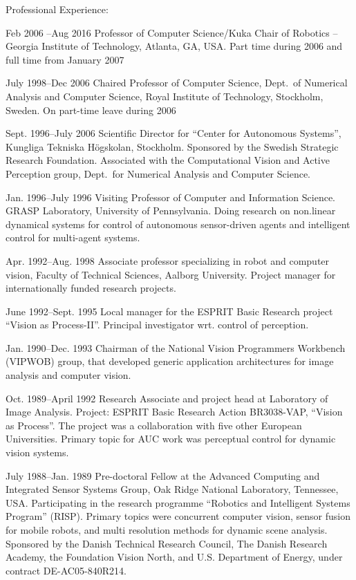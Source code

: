 \documentclass{article}
\begin{document}
\begin{cv}
\begin{cvlist}{Professional Experience:}
\item[Feb 2006 --Aug 2016]  Professor of Computer Science/Kuka
  Chair of Robotics -- Georgia Institute of Technology, Atlanta, GA,
  USA. Part time during 2006 and full time from January 2007

\item[July 1998--Dec 2006] Chaired Professor of Computer Science,
  Dept.\ of Numerical Analysis and Computer Science, Royal Institute
  of Technology, Stockholm, Sweden. On part-time leave during 2006

\item[Sept. 1996--July 2006] Scientific Director for ``Center for
  Autonomous Systems'', Kungliga Tek\-ni\-ska H\"og\-skolan,
  Stock\-holm.  Sponsored by the Swedish Strategic Research
  Foundation. Associated with the Computational Vision and Active
  Perception group, Dept.~for Numerical Analysis and Computer
  Science.

\item[Jan. 1996--July 1996] Visiting Professor of Computer and
  Information Science.  GRASP Laboratory, University of Pennsylvania.
  Doing research on non.linear dynamical systems for control of
  autonomous sensor-driven agents and intelligent control for
  multi-agent systems.

\item[Apr. 1992--Aug. 1998] Associate professor specializing in robot
  and computer vision, Faculty of Technical Sciences, Aalborg
  University.  Project manager for internationally funded research
  projects.

\item[June 1992--Sept. 1995] Local manager for the ESPRIT Basic
  Research project ``Vision as Process-II''.  Principal investigator
  wrt.  control of perception.

\item[Jan. 1990--Dec. 1993] Chairman of the National Vision
  Programmers Workbench (VIPWOB) group, that developed generic
  application architectures for image analysis and computer vision.

\item[Oct. 1989--April 1992] Research Associate and project head
  at Laboratory of Image Analysis.  Project: ESPRIT Basic Research
  Action BR3038-VAP, ``Vision as Process''.  The project was a
  collaboration with five other European Universities.  Primary topic
  for AUC work was perceptual control for dynamic vision systems.

\item[July 1988--Jan. 1989] Pre-doctoral Fellow at the Advanced
  Computing and Integrated Sensor Systems Group, Oak Ridge National
  Laboratory, Tennessee, USA. Participating in the research programme
  ``Robotics and Intelligent Systems Program'' (RISP). Primary topics
  were concurrent computer vision, sensor fusion for mobile robots,
  and multi resolution methods for dynamic scene analysis. Sponsored
  by the Danish Technical Research Council, The Danish Research
  Academy, the Foundation Vision North, and U.S. Department of Energy,
  under contract DE-AC05-840R214.


\end{cvlist}
\end{cv}
\end{document}
